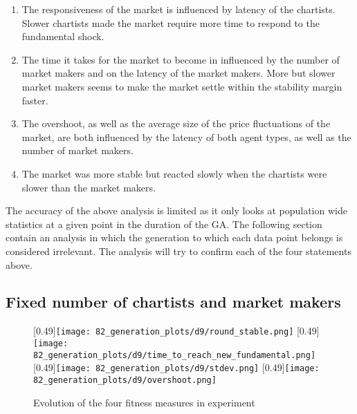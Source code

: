 \begin{enumerate}
\item The responsiveness of the market is influenced by latency of the chartists. Slower chartists made the market require more time to respond to the fundamental shock.
\item The time it takes for the market to become in influenced by the number of market makers and on the latency of the market makers. More but slower market makers seems to make the market settle within the stability margin faster.
\item The overshoot, as well as the average size of the price fluctuations of the market, are both influenced by the latency of both agent types, as well as the number of market makers.
\item The market was more stable but reacted slowly when the chartists were slower than the market makers.
\end{enumerate}
The accuracy of the above analysis is limited as it only looks at population wide statistics at a given point in the duration of the GA. The following section contain an analysis in which the generation to which each data point belongs is considered irrelevant. The analysis will try to confirm each of the four statements above.

\subsection{Fixed number of chartists and market makers}

\begin{figure}
	\centering
	[0.49\linewidth]{\texttt{[image: 82\_generation\_plots/d9/round\_stable.png]}}
	[0.49\linewidth]{\texttt{[image: 82\_generation\_plots/d9/time\_to\_reach\_new\_fundamental.png]}}
	[0.49\linewidth]{\texttt{[image: 82\_generation\_plots/d9/stdev.png]}}
	[0.49\linewidth]{\texttt{[image: 82\_generation\_plots/d9/overshoot.png]}}
	\caption{Evolution of the four fitness measures in experiment \dnine}
	\label{fig:d9_evolution_fitness}
\end{figure}


